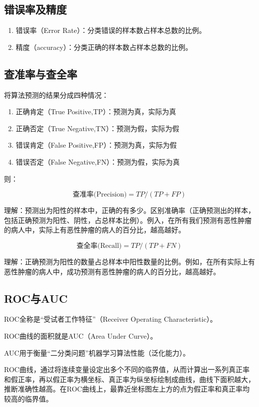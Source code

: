 \subsection{错误率及精度}

\begin{enumerate}
\itemsep0em
\item 错误率（Error Rate）：分类错误的样本数占样本总数的比例。
\item 精度（accuracy）：分类正确的样本数占样本总数的比例。
\end{enumerate}


\subsection{查准率与查全率}

将算法预测的结果分成四种情况：

\begin{enumerate}
	\itemsep0em
	\item 正确肯定（True Positive,TP）：预测为真，实际为真
	\item 正确否定（True Negative,TN）：预测为假，实际为假
	\item 错误肯定（False Positive,FP）：预测为真，实际为假
	\item 错误否定（False Negative,FN）：预测为假，实际为真
\end{enumerate}


则：

$$
\mbox{查准率(Precision)}=TP/(TP+FP)
$$

理解：预测出为阳性的样本中，正确的有多少。区别准确率（正确预测出的样本，包括正确预测为阳性、阴性，占总样本比例）。例入，在所有我们预测有恶性肿瘤的病人中，实际上有恶性肿瘤的病人的百分比，越高越好。

$$
\mbox{查全率(Recall)}=TP/(TP+FN)
$$

理解：正确预测为阳性的数量占总样本中阳性数量的比例。例如，在所有实际上有恶性肿瘤的病人中，成功预测有恶性肿瘤的病人的百分比，越高越好。

\subsection{ROC与AUC}

ROC全称是``受试者工作特征''（Receiver Operating Characteristic）。

ROC曲线的面积就是AUC（Area Under Curve）。

AUC用于衡量``二分类问题''机器学习算法性能（泛化能力）。

ROC曲线，通过将连续变量设定出多个不同的临界值，从而计算出一系列真正率和假正率，再以假正率为横坐标、真正率为纵坐标绘制成曲线，曲线下面积越大，推断准确性越高。在ROC曲线上，最靠近坐标图左上方的点为假正率和真正率均较高的临界值。

